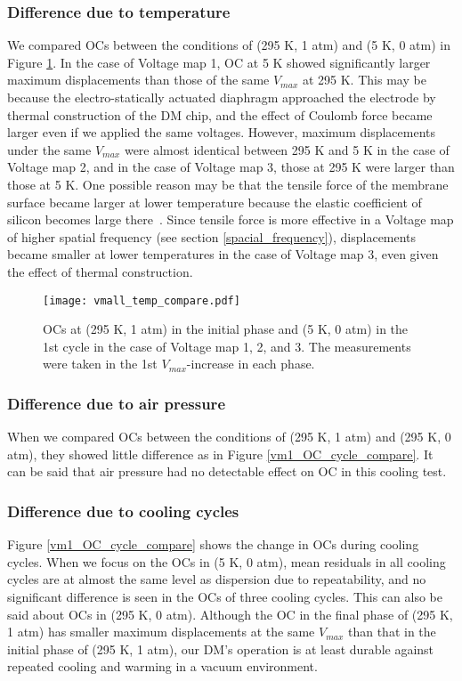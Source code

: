 \documentclass[a4paper]{article}
\begin{document}
\subsubsection{Difference due to temperature}
We compared OCs between the conditions of (295 K, 1 atm) and (5 K, 0 atm) in Figure \ref{vmall_temp_compare}. In the case of Voltage map 1, OC at 5 K showed significantly larger maximum displacements than those of the same $V_{max}$ at 295 K. This may be because the electro-statically actuated diaphragm approached the electrode by thermal construction of the DM chip, and the effect of Coulomb force became larger even if we applied the same voltages. However, maximum displacements under the same $V_{max}$ were almost identical between 295 K and 5 K in the case of Voltage map 2, and in the case of Voltage map 3, those at 295 K were larger than those at 5 K. One possible reason may be that the tensile force of the membrane surface became larger at lower temperature because the elastic coefficient of silicon becomes large there~\cite{Si}. Since tensile force is more effective in a Voltage map of higher spatial frequency (see section \ref{spacial_frequency}), displacements became smaller at lower temperatures in the case of Voltage map 3, even given the effect of thermal construction.

\begin{figure}[htbp]
\centering
\texttt{[image: vmall\_temp\_compare.pdf]}
\caption{OCs at (295 K, 1 atm) in the initial phase and (5 K, 0 atm) in the 1st cycle in the case of Voltage map 1, 2, and 3. The measurements were taken in the 1st $V_{max}$-increase in each phase.}
\label{vmall_temp_compare}
\end{figure}

\subsubsection{Difference due to air pressure}
When we compared OCs between the conditions of (295 K, 1 atm) and (295 K, 0 atm), they showed little difference as in Figure \ref{vm1_OC_cycle_compare}. It can be said that air pressure had no detectable effect on OC in this cooling test.

\subsubsection{Difference due to cooling cycles}
Figure \ref{vm1_OC_cycle_compare} shows the change in OCs during cooling cycles. When we focus on the OCs in (5 K, 0 atm), mean residuals in all cooling cycles are at almost the same level as dispersion due to repeatability, and no significant difference is seen in the OCs of three cooling cycles. This can also be said about OCs in (295 K, 0 atm). Although the OC in the final phase of (295 K, 1 atm) has smaller maximum displacements at the same $V_{max}$ than that in the initial phase of (295 K, 1 atm), our DM's operation is at least durable against repeated cooling and warming in a vacuum environment.
\end{document}

